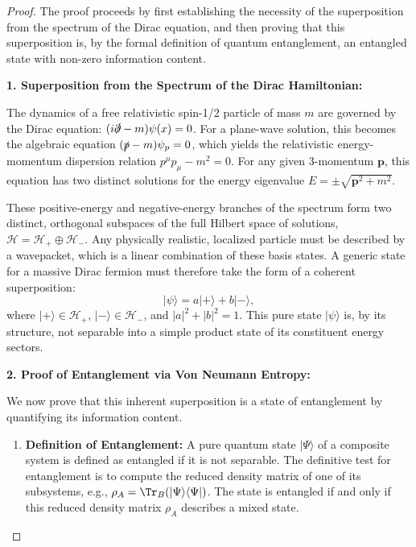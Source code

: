 \documentclass[11pt, letterpaper]{report}
\theoremstyle{plain} %
\theoremstyle{definition} %
\theoremstyle{remark} %
\begin{document}
\begin{proof}
The proof proceeds by first establishing the necessity of the superposition from the spectrum of the Dirac equation, and then proving that this superposition is, by the formal definition of quantum entanglement, an entangled state with non-zero information content.

\textbf{1. Superposition from the Spectrum of the Dirac Hamiltonian:}

The dynamics of a free relativistic spin-1/2 particle of mass $m$ are governed by the Dirac equation: $(i\slashed{\partial} - m) \psi(x) = 0$. For a plane-wave solution, this becomes the algebraic equation $(\slashed{p} - m)\psi_p = 0$, which yields the relativistic energy-momentum dispersion relation $p^\mu p_\mu - m^2 = 0$. For any given 3-momentum $\mathbf{p}$, this equation has two distinct solutions for the energy eigenvalue $E = \pm \sqrt{\mathbf{p}^2 + m^2}$.

These positive-energy and negative-energy branches of the spectrum form two distinct, orthogonal subspaces of the full Hilbert space of solutions, $\mathcal{H} = \mathcal{H}_+ \oplus \mathcal{H}_-$. Any physically realistic, localized particle must be described by a wavepacket, which is a linear combination of these basis states. A generic state for a massive Dirac fermion must therefore take the form of a coherent superposition:
\begin{equation}
    |\psi\rangle = a |+ \rangle + b |-\rangle,
\end{equation}
where $|+\rangle \in \mathcal{H}_+$, $|-\rangle \in \mathcal{H}_-$, and $|a|^2+|b|^2=1$. This pure state $|\psi\rangle$ is, by its structure, not separable into a simple product state of its constituent energy sectors.

\textbf{2. Proof of Entanglement via Von Neumann Entropy:}

We now prove that this inherent superposition is a state of entanglement by quantifying its information content.
\begin{enumerate}[label=(\alph*)]
    \item \textbf{Definition of Entanglement:} A pure quantum state $|\Psi\rangle$ of a composite system is defined as entangled if it is not separable. The definitive test for entanglement is to compute the reduced density matrix of one of its subsystems, e.g., $\rho_A = \Tr_B(|\Psi\rangle\langle\Psi|)$. The state is entangled if and only if this reduced density matrix $\rho_A$ describes a mixed state.


\end{enumerate}
\end{proof}
\end{document}
